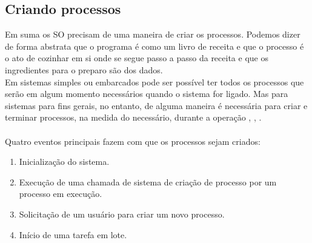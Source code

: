 \subsection{Criando processos}

Em suma os SO precisam de uma maneira de criar os processos. Podemos dizer de forma abstrata que o programa é como um livro de receita e que o processo é o ato de cozinhar em si onde se segue passo a passo da receita e que os ingredientes para o preparo são dos dados.\\
Em sistemas simples ou embarcados pode ser possível ter todos os processos que serão em algum momento necessários quando o sistema for ligado.
Mas para sistemas para fins gerais, no entanto, de alguma maneira é necessária para criar e terminar processos, na medida do necessário, durante a operação \cite{Tanenbaum2016}, \cite{info2020}, \cite{Morimoto2011}.\\
 \\Quatro eventos principais fazem com que os processos sejam criados:
    \begin{enumerate}
        \item Inicialização do sistema.
        \item Execução de uma chamada de sistema de criação de processo por um processo em execução.
        \item Solicitação de um usuário para criar um novo processo.
        \item Início de uma tarefa em lote. 
    \end{enumerate}


